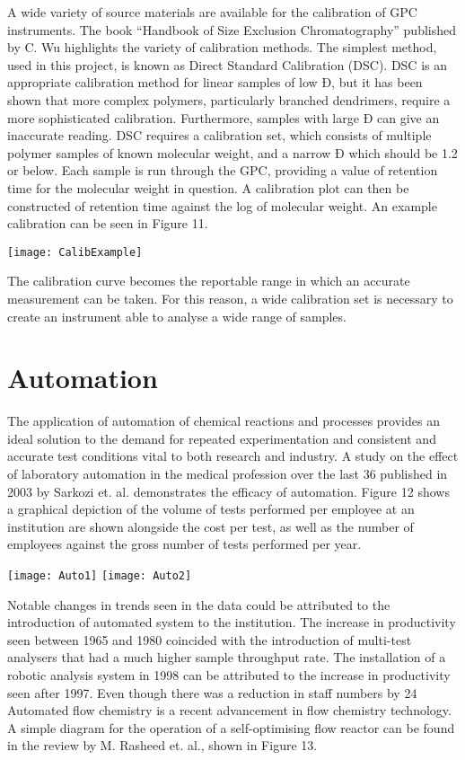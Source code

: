 A wide variety of source materials are available for the calibration of GPC instruments. The book “Handbook of Size Exclusion Chromatography” published by C. Wu highlights the variety of calibration methods. The simplest method, used in this project, is known as Direct Standard Calibration (DSC). DSC is an appropriate calibration method for linear samples of low Đ, but it has been shown that more complex polymers, particularly branched dendrimers, require a more sophisticated calibration. Furthermore, samples with large Đ can give an inaccurate reading.
DSC requires a calibration set, which consists of multiple polymer samples of known molecular weight, and a narrow Đ which should be 1.2 or below. Each sample is run through the GPC, providing a value of retention time for the molecular weight in question. A calibration plot can then be constructed of retention time against the log of molecular weight. An example calibration can be seen in Figure 11.

\texttt{[image: CalibExample]}

The calibration curve becomes the reportable range in which an accurate measurement can be taken. For this reason, a wide calibration set is necessary to create an instrument able to analyse a wide range of samples.

\section{Automation}

The application of automation of chemical reactions and processes provides an ideal solution to the demand for repeated experimentation and consistent and accurate test conditions vital to both research and industry. A study on the effect of laboratory automation in the medical profession over the last 36 published in 2003 by Sarkozi et. al. demonstrates the efficacy of automation. Figure 12 shows a graphical depiction of the volume of tests performed per employee at an institution are shown alongside the cost per test, as well as the number of employees against the gross number of tests performed per year.

\texttt{[image: Auto1]}
\texttt{[image: Auto2]}

Notable changes in trends seen in the data could be attributed to the introduction of automated system to the institution. The increase in productivity seen between 1965 and 1980 coincided with the introduction of multi-test analysers that had a much higher sample throughput rate. The installation of a robotic analysis system in 1998 can be attributed to the increase in productivity seen after 1997. Even though there was a reduction in staff numbers by 24 %
Automated flow chemistry is a recent advancement in flow chemistry technology. A simple diagram for the operation of a self-optimising flow reactor can be found in the review by M. Rasheed et. al., shown in Figure 13. 

